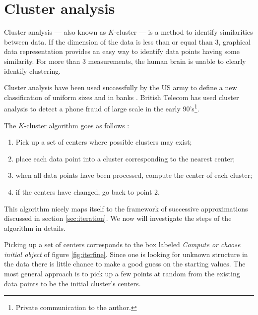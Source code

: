 \documentclass[twoside]{book}
\begin{document}
\section{Cluster analysis}
\label{sec:cluster} Cluster analysis --- also known as $K$-cluster
--- is a method to identify similarities between data. If the
dimension of the data is less than or equal than 3, graphical data
representation provides an easy way to identify data points having
some similarity. For more than 3 measurements, the human brain is
unable to clearly identify clustering.

Cluster analysis have been used successfully by the US army to
define a new classification of uniform sizes and in banks
\cite{BerLin}. British Telecom has used cluster analysis to detect
a phone fraud of large scale in the early 90's\footnote{Private
communication to the author.}.

\noindent The $K$-cluster algorithm goes as follows \cite{BerLin}:
\begin{enumerate}
  \item Pick up a set of centers where possible clusters may
  exist;
  \item place each data point into a cluster corresponding to the
  nearest center;
  \item when all data points have been processed, compute the
  center of each cluster;
  \item if the centers have changed, go back to point 2.
\end{enumerate}
This algorithm nicely maps itself to the framework of successive
approximations discussed in section \ref{sec:iteration}. We now
will investigate the steps of the algorithm in details.

 Picking up a set of centers
corresponds to the box labeled {\sl Compute or choose initial
object} of figure \ref{fig:iterfine}. Since one is looking for
unknown structure in the data there is little chance to make a
good guess on the starting values. The most general approach is to
pick up a few points at random from the existing data points to be
the initial cluster's centers.
\end{document}
